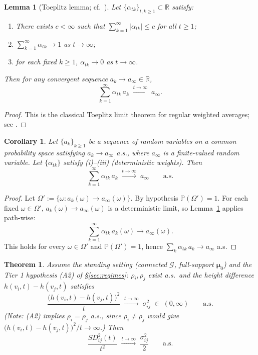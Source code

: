 \documentclass[11pt]{article}
\newtheorem{thm}{Theorem}
\newtheorem{lem}{Lemma}
\newtheorem{cor}{Corollary}
\theoremstyle{definition}
\begin{document}
\begin{lem}[Toeplitz lemma; cf.\ {\cite[\S43]{Knopp1928}}]
\label{lem:Toeplitz}
Let $\{\alpha_{tk}\}_{t, k \geq 1} \subset \mathbb{R}$ satisfy:
\begin{enumerate}[label=\textnormal{(\roman*)}, leftmargin=2.5em]
  \item There exists $c < \infty$ such that $\sum_{k=1}^{\infty} |\alpha_{tk}| \leq c$ for all $t \geq 1$;
  \item $\sum_{k=1}^{\infty} \alpha_{tk} \to 1$ as $t \to \infty$;
  \item for each fixed $k \geq 1$, $\alpha_{tk} \to 0$ as $t \to \infty$.
\end{enumerate}
Then for any convergent sequence $a_k \to a_\infty \in \mathbb{R}$,
\[
  \sum_{k=1}^{\infty} \alpha_{tk}\, a_k \;\xrightarrow{t \to \infty}\; a_\infty.
\]
\end{lem}
\begin{proof}
This is the classical Toeplitz limit theorem for regular weighted averages; see \cite[\S43]{Knopp1928}.
\end{proof}

\begin{cor}
\label{cor:Toeplitz-as}
Let $\{a_k\}_{k \geq 1}$ be a sequence of random variables on a common probability space satisfying $a_k \to a_\infty$ a.s., where $a_\infty$ is a finite-valued random variable. Let $\{\alpha_{tk}\}$ satisfy (i)--(iii) (deterministic weights). Then
\[
  \sum_{k=1}^{\infty} \alpha_{tk}\, a_k
  \;\xrightarrow{t \to \infty}\; a_\infty
  \qquad \text{a.s.}
\]
\end{cor}

\begin{proof}
Let $\Omega' := \{\omega : a_k(\omega) \to a_\infty(\omega)\}$. By hypothesis $\mathbb{P}(\Omega') = 1$. For each fixed $\omega \in \Omega'$, $a_k(\omega) \to a_\infty(\omega)$ is a deterministic limit, so Lemma~\ref{lem:Toeplitz} applies path-wise:
\[
  \sum_{k=1}^{\infty} \alpha_{tk}\, a_k(\omega) \to a_\infty(\omega).
\]
This holds for every $\omega \in \Omega'$ and $\mathbb{P}(\Omega') = 1$, hence $\sum_k \alpha_{tk}\, a_k \to a_\infty$ a.s.
\end{proof}

\begin{thm}
\label{thm:intermediate}
Assume the standing setting (connected $\mathcal{G}$, full-support $\boldsymbol{\mu}_0$) and the Tier 1 hypothesis (A2) of \S\ref{sec:regimes}: $\rho_i, \rho_j$ exist a.s.\ and the height difference $h(v_i, t) - h(v_j, t)$ satisfies
\[
  \frac{\bigl(h(v_i, t) - h(v_j, t)\bigr)^2}{t} \;\xrightarrow{t \to \infty}\; \sigma^2_{ij} \;\in\; (0, \infty) \qquad \text{a.s.}
\]
(Note: (A2) implies $\rho_i = \rho_j$ a.s., since $\rho_i \neq \rho_j$ would give $\bigl(h(v_i, t) - h(v_j, t)\bigr)^2/t \to \infty$.)
Then
\[
  \frac{SD^2_{ij}(t)}{t^2} \;\xrightarrow{t \to \infty}\; \frac{\sigma^2_{ij}}{2} \qquad \text{a.s.}
\]
\end{thm}
\end{document}
